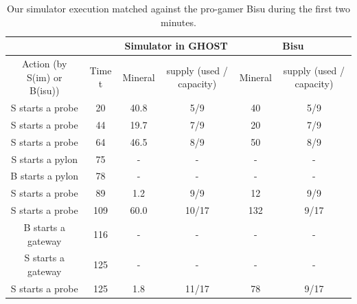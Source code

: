 \documentclass[journal]{IEEEtran}
\newcommand{\ghost}{\textsc{GHOST}\xspace}
\begin{document}
\begin{table}[ht]
  \caption{Our simulator execution matched  against the pro-gamer Bisu
    during the first two minutes.}
  \label{tab:korean}
  \centering
  \begin{tabular}{|c|c|c|c|c|c|} 
    \cline{3-6}
    \multicolumn{2}{c|}{} & \multicolumn{2}{c|}{Simulator in \ghost} & \multicolumn{2}{c|}{Bisu}\\ 
    \hline
    Action (by S(im) or B(isu)) & Time t & \multicolumn{1}{c|}{Mineral} & \multicolumn{1}{c|}{supply (used / capacity)} & \multicolumn{1}{c|}{Mineral} & \multicolumn{1}{c|}{supply (used / capacity)}\\
    \hline
    S starts a probe & 20 & 40.8 & 5/9 & 40 & 5/9\\
    S starts a probe & 44 & 19.7 & 7/9 & 20 & 7/9\\
    S starts a probe & 64 & 46.5 & 8/9 & 50 & 8/9\\
    S starts a pylon & 75 & - & - & - & -\\
    B starts a pylon & 78 & - & - & - & -\\
    S starts a probe & 89 & 1.2 & 9/9 & 12 & 9/9\\
    S starts a probe & 109 & 60.0 & 10/17 & 132 & 9/17\\
    B starts a gateway & 116 & - & - & - & -\\
    S starts a gateway & 125 & - & - & - & -\\
    S starts a probe & 125 & 1.8 & 11/17 & 78 & 9/17\\
    \hline    
  \end{tabular}
\end{table}
\end{document}
